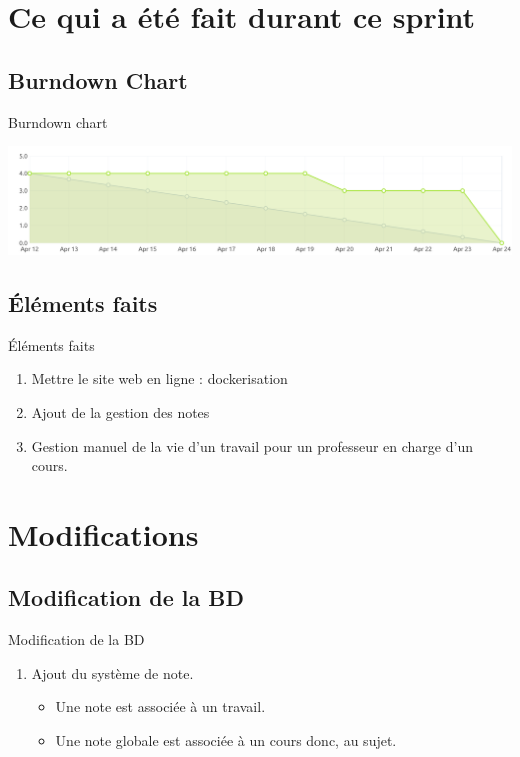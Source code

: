 \documentclass[numbering=fraction]{beamer}
\begin{document}
\section{Ce qui a été fait durant ce sprint}
\subsection{Burndown Chart}
\begin{frame}{Burndown chart}
    \centering
    
    \includegraphics[width=1.1\textwidth]{burndownChart.png} 
\end{frame}
\subsection{Éléments faits}
\begin{frame}{Éléments faits}
   \begin{enumerate}
    \item Mettre le site web en ligne : dockerisation
    \item Ajout de la gestion des notes
    \item Gestion manuel de la vie d'un travail pour un professeur en charge d'un cours.
   \end{enumerate}

\end{frame}
\section{Modifications}
\subsection{Modification de la BD}
\begin{frame}{Modification de la BD}
    \begin{enumerate}
        \item Ajout du système de note.
        \begin{itemize}
            \item Une note est associée à un travail.
            \item Une note globale est associée à un cours donc, au sujet.
        \end{itemize}
    \end{enumerate}
\end{frame}
\end{document}
